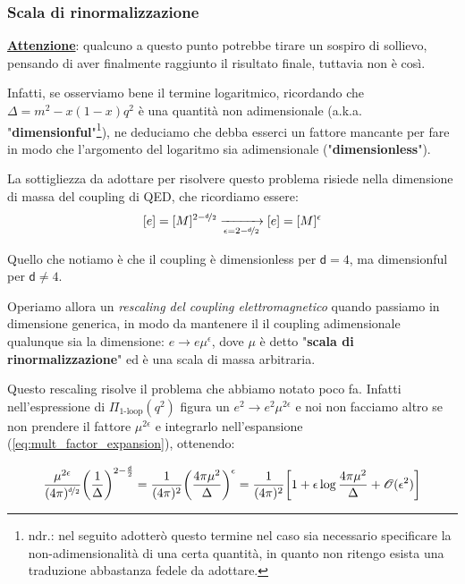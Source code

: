 \documentclass[../main.tex]{subfiles}
\begin{document}
\subsubsection{Scala di rinormalizzazione}

\underline{\textbf{Attenzione}}: qualcuno a questo punto potrebbe tirare un sospiro di sollievo, pensando di aver finalmente raggiunto il risultato finale, tuttavia non è così. 

Infatti, se osserviamo bene il termine logaritmico, ricordando che $\Delta = m^2-x(1-x)q^2$ è una quantità non adimensionale (a.k.a. "\textbf{dimensionful}"\footnote{ndr.: nel seguito adotterò questo termine nel caso sia necessario specificare la non-adimensionalità di una certa quantità, in quanto non ritengo esista una traduzione abbastanza fedele da adottare.}), ne deduciamo che debba esserci un fattore mancante per fare in modo che l'argomento del logaritmo sia adimensionale ("\textbf{dimensionless}").

La sottigliezza da adottare per risolvere questo problema risiede nella dimensione di massa del coupling di QED, che ricordiamo essere:
\[
[e] = [M]^{2-\nicefrac{\mathsf d}{2}} \xrightarrow[\epsilon = 2-\nicefrac{\mathsf d}{2}]{} [e] = [M]^\epsilon
\]

Quello che notiamo è che il coupling è dimensionless per $\mathsf d = 4$, ma dimensionful per $\mathsf d \neq 4$.

Operiamo allora un \textit{rescaling del coupling elettromagnetico} quando passiamo in dimensione generica, in modo da mantenere il il coupling adimensionale qualunque sia la dimensione: $\boxed{e\rightarrow e\mu^\epsilon}$, dove $\mu$ è detto "\textbf{scala di rinormalizzazione}" ed è una scala di massa arbitraria.

Questo rescaling risolve il problema che abbiamo notato poco fa. Infatti nell'espressione di $\Pi_{\text{1-loop}}(q^2)$ figura un $e^2 \rightarrow e^2\mu^{2\epsilon}$ e noi non facciamo altro se non prendere il fattore $\mu^{2\epsilon}$ e integrarlo nell'espansione (\ref{eq:mult_factor_expansion}), ottenendo:

\begin{equation}
    \frac{\mu^{2\epsilon}}{(4\pi)^{\nicefrac{\mathsf d}{2}}}\bigg(\frac{1}{\Delta}\bigg)^{ 2 - \frac{\mathsf d}{2}} = \frac{1}{(4\pi)^2}\bigg(\frac{4\pi\mu^2}{\Delta}\bigg)^\epsilon = \frac{1}{(4\pi)^{2}}\bigg[1 + \epsilon\log{\frac{4\pi\mu^2}{\Delta}} + \mathscr{O}(\epsilon^2) \bigg]
    \label{eq:mult_factor_expansion_dimensionless}
\end{equation}
\end{document}
